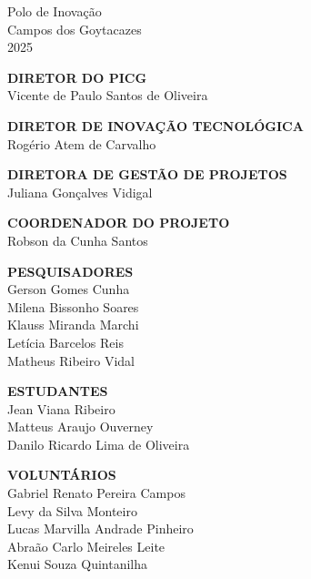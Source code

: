 \begin{center}
    \vfill
    \centering
    Polo de Inovação\\
    Campos dos Goytacazes\\
    2025

    \newpage

    \vfill
    \textbf{DIRETOR DO PICG}\\
    Vicente de Paulo Santos de Oliveira
    \vfill
    
    \textbf{DIRETOR DE INOVAÇÃO TECNOLÓGICA}\\
    Rogério Atem de Carvalho
    \vfill
    
    \textbf{DIRETORA DE GESTÃO DE PROJETOS}\\
    Juliana Gonçalves Vidigal
    \vfill
    
    \textbf{COORDENADOR DO PROJETO}\\
    Robson da Cunha Santos
    \vfill
    
    \textbf{PESQUISADORES}\\
    Gerson Gomes Cunha\\
    Milena Bissonho Soares\\
    Klauss Miranda Marchi \\
    Letícia Barcelos Reis \\
    Matheus Ribeiro Vidal
    \vfill
    
    \textbf{ESTUDANTES}\\
    Jean Viana Ribeiro \\
    Matteus Araujo Ouverney\\
    Danilo Ricardo Lima de Oliveira
    \vfill

    \textbf{VOLUNTÁRIOS}\\
    Gabriel Renato Pereira Campos\\
    Levy da Silva Monteiro\\
    Lucas Marvilla Andrade Pinheiro\\
    Abraão Carlo Meireles Leite\\
    Kenui Souza Quintanilha
    \vfill
\end{center}
